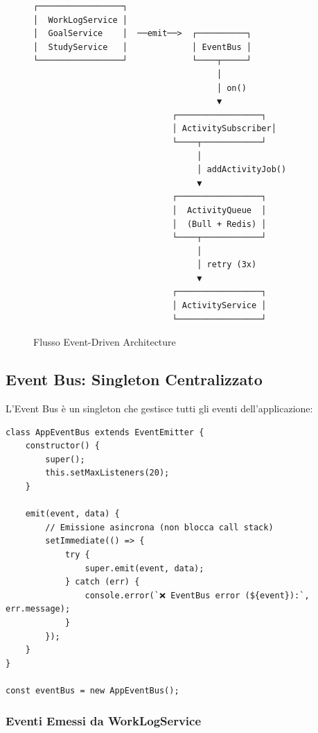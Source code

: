 \documentclass[11pt,a4paper]{article}
\begin{document}
\begin{figure}[H]
\centering
\begin{lstlisting}[caption=Architettura Event-Driven]
┌─────────────────┐
│  WorkLogService │
│  GoalService    │  ──emit──>  ┌──────────┐
│  StudyService   │             │ EventBus │
└─────────────────┘             └────┬─────┘
                                     │
                                     │ on()
                                     ▼
                            ┌─────────────────┐
                            │ ActivitySubscriber│
                            └────┬────────────┘
                                 │
                                 │ addActivityJob()
                                 ▼
                            ┌─────────────────┐
                            │  ActivityQueue  │
                            │  (Bull + Redis) │
                            └────┬────────────┘
                                 │
                                 │ retry (3x)
                                 ▼
                            ┌─────────────────┐
                            │ ActivityService │
                            └─────────────────┘
\end{lstlisting}
\caption{Flusso Event-Driven Architecture}
\end{figure}

\subsection{Event Bus: Singleton Centralizzato}

L'Event Bus è un singleton che gestisce tutti gli eventi dell'applicazione:

\begin{lstlisting}[caption=Event Bus Implementation]
class AppEventBus extends EventEmitter {
    constructor() {
        super();
        this.setMaxListeners(20);
    }

    emit(event, data) {
        // Emissione asincrona (non blocca call stack)
        setImmediate(() => {
            try {
                super.emit(event, data);
            } catch (err) {
                console.error(`❌ EventBus error (${event}):`, err.message);
            }
        });
    }
}

const eventBus = new AppEventBus();
\end{lstlisting}

\subsubsection{Eventi Emessi da WorkLogService}
\end{document}
